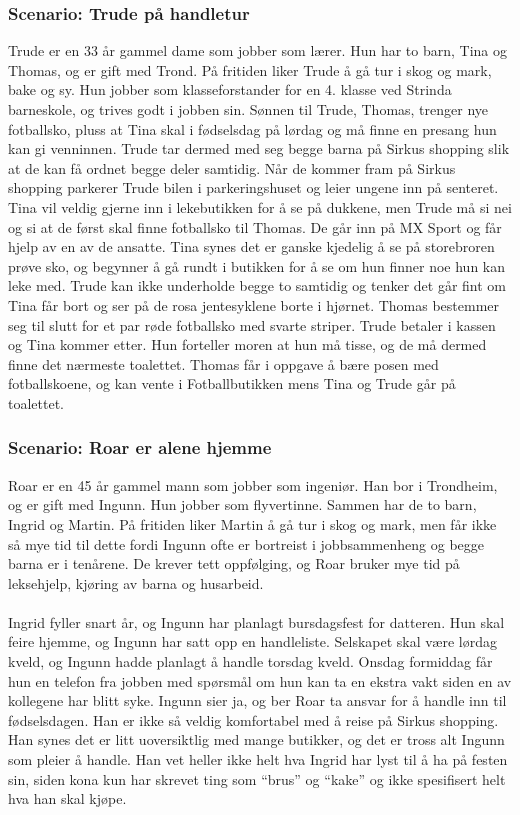 \subsubsection{Scenario: Trude på handletur}
Trude er en 33 år gammel dame som jobber som lærer. Hun har to barn, Tina og Thomas, og er gift med Trond. På fritiden liker Trude å gå tur i skog og mark, bake og sy. Hun jobber som klasseforstander for en 4. klasse ved Strinda barneskole, og trives godt i jobben sin. Sønnen til Trude, Thomas, trenger nye fotballsko, pluss at Tina skal i fødselsdag på lørdag og må finne en presang hun kan gi venninnen. Trude tar dermed med seg begge barna på Sirkus shopping slik at de kan få ordnet begge deler samtidig. Når de kommer fram på Sirkus shopping parkerer Trude bilen i parkeringshuset og leier ungene inn på senteret. Tina vil veldig gjerne inn i lekebutikken for å se på dukkene, men Trude må si nei og si at de først skal finne fotballsko til Thomas. De går inn på MX Sport og får hjelp av en av de ansatte. Tina synes det er ganske kjedelig å se på storebroren prøve sko, og begynner å gå rundt i butikken for å se om hun finner noe hun kan leke med. Trude kan ikke underholde begge to samtidig og tenker det går fint om Tina får bort og ser på de rosa jentesyklene borte i hjørnet. Thomas bestemmer seg til slutt for et par røde fotballsko med svarte striper. Trude betaler i kassen og Tina kommer etter. Hun forteller moren at hun må tisse, og de må dermed finne det nærmeste toalettet. Thomas får i oppgave å bære posen med fotballskoene, og kan vente i Fotballbutikken mens Tina og Trude går på toalettet. 

\subsubsection{Scenario: Roar er alene hjemme}
Roar er en 45 år gammel mann som jobber som ingeniør. Han bor i Trondheim, og er gift med Ingunn. Hun jobber som flyvertinne. Sammen har de to barn, Ingrid og Martin. På fritiden liker Martin å gå tur i skog og mark, men får ikke så mye tid til dette fordi Ingunn ofte er bortreist i jobbsammenheng og begge barna er i tenårene. De krever tett oppfølging, og Roar bruker mye tid på leksehjelp, kjøring av barna og husarbeid. 
\\\\
Ingrid fyller snart år, og Ingunn har planlagt bursdagsfest for datteren. Hun skal feire hjemme, og Ingunn har satt opp en handleliste. Selskapet skal være lørdag kveld, og Ingunn hadde planlagt å handle torsdag kveld. Onsdag formiddag får hun en telefon fra jobben med spørsmål om hun kan ta en ekstra vakt siden en av kollegene har blitt syke. Ingunn sier ja, og ber Roar ta ansvar for å handle inn til fødselsdagen. Han er ikke så veldig komfortabel med å reise på Sirkus shopping. Han synes det er litt uoversiktlig med mange butikker, og det er tross alt Ingunn som pleier å handle. Han vet heller ikke helt hva Ingrid har lyst til å ha på festen sin, siden kona kun har skrevet ting som “brus” og “kake” og ikke spesifisert helt hva han skal kjøpe.

